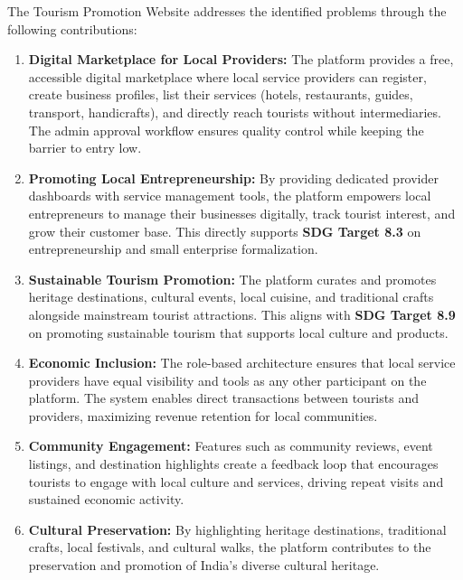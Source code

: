 The Tourism Promotion Website addresses the identified problems through the following contributions:

\begin{enumerate}[leftmargin=2em]
    \item \textbf{Digital Marketplace for Local Providers:} The platform provides a free, accessible digital marketplace where local service providers can register, create business profiles, list their services (hotels, restaurants, guides, transport, handicrafts), and directly reach tourists without intermediaries. The admin approval workflow ensures quality control while keeping the barrier to entry low.

    \item \textbf{Promoting Local Entrepreneurship:} By providing dedicated provider dashboards with service management tools, the platform empowers local entrepreneurs to manage their businesses digitally, track tourist interest, and grow their customer base. This directly supports \textbf{SDG Target 8.3} on entrepreneurship and small enterprise formalization.

    \item \textbf{Sustainable Tourism Promotion:} The platform curates and promotes heritage destinations, cultural events, local cuisine, and traditional crafts alongside mainstream tourist attractions. This aligns with \textbf{SDG Target 8.9} on promoting sustainable tourism that supports local culture and products.

    \item \textbf{Economic Inclusion:} The role-based architecture ensures that local service providers have equal visibility and tools as any other participant on the platform. The system enables direct transactions between tourists and providers, maximizing revenue retention for local communities.

    \item \textbf{Community Engagement:} Features such as community reviews, event listings, and destination highlights create a feedback loop that encourages tourists to engage with local culture and services, driving repeat visits and sustained economic activity.

    \item \textbf{Cultural Preservation:} By highlighting heritage destinations, traditional crafts, local festivals, and cultural walks, the platform contributes to the preservation and promotion of India's diverse cultural heritage.
\end{enumerate}

